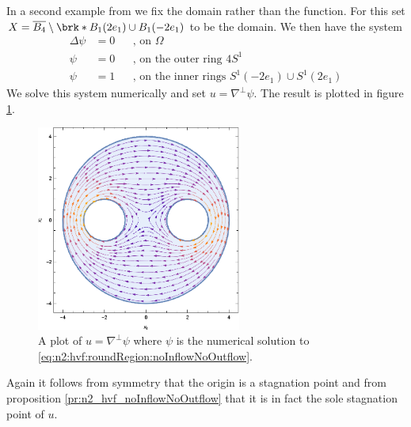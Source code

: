 In a second example from \cite{Wahlen2023} we fix the domain rather than the function.
For this set $X=\overline{B_4}\setminus\brk*{B_1(2e_1)\cup B_1(-2e_1)}$ to be the domain.
We then have the system
\begin{equation}
  \begin{aligned}
    \Delta \psi&=0 &&\text{, on }\Omega \\
    \psi&=0 &&\text{, on the outer ring }4S^1 \\
    \psi&=1 &&\text{, on the inner rings }S^1(-2e_1)\cup S^1(2e_1)
  \end{aligned}\label{eq:n2:hvf:roundRegion:noInflowNoOutflow}
\end{equation}
We solve this system numerically and set $u=\nabla^\perp\psi$.
The result is plotted in figure \ref{pl:n2_hvf_roundRegion_noInflowNoOutflow}.
\begin{figure}
  \centering
  \includegraphics[width=0.6\textwidth]{../Plots/HarmonicVectorFields_gr4.eps}
  \caption{A plot of $u=\nabla^\perp\psi$ where $\psi$ is the numerical solution to
   \eqref{eq:n2:hvf:roundRegion:noInflowNoOutflow}.}
  \label{pl:n2_hvf_roundRegion_noInflowNoOutflow}
\end{figure}
Again it follows from symmetry that the origin is a stagnation point and
from proposition \ref{pr:n2_hvf_noInflowNoOutflow} that it is in fact the sole stagnation point of $u$.

